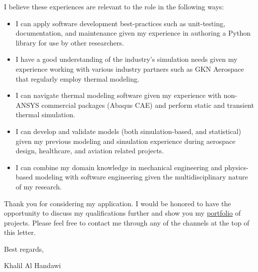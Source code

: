 \documentclass[12pt]{article} %
\begin{document}
I believe these experiences are relevant to the role in the following ways: 

\begin{itemize}
	\item I can apply software development best-practices such as unit-testing, documentation, and maintenance given my experience in authoring a Python library for use by other researchers.
	\item I have a good understanding of the industry's simulation needs given my experience working with various industry partners such as GKN Aerospace that regularly employ thermal modeling.
	\item I can navigate thermal modeling software given my experience with non-ANSYS commercial packages (Abaqus CAE) and perform static and transient thermal simulation.
	\item I can develop and validate models (both simulation-based, and statistical) given my previous modeling and simulation experience during aerospace design, healthcare, and aviation related projects.
	\item I can combine my domain knowledge in mechanical engineering and physics-based modeling with software engineering given the multidisciplinary nature of my research.
\end{itemize}

\medskip %

Thank you for considering my application. I would be honored to have the opportunity to discuss my qualifications further and show you my \href{https://khbalhandawi.github.io/projects/}{portfolio} of projects. Please feel free to contact me through any of the channels at the top of this letter.

\medskip %

Best regards,

\medskip %


Khalil Al Handawi


\medskip %

\end{document}
